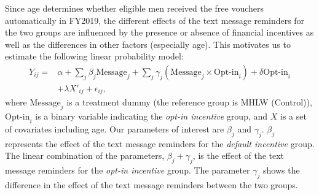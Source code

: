 \documentclass[
      12pt,
    a4paper
]{article}
\begin{document}
Since age determines whether eligible men received the free vouchers automatically in FY2019, the different effects of the text message reminders for the two groups are influenced by the presence or absence of financial incentives as well as the differences in other factors (especially age). This motivates us to estimate the following linear probability model:
\begin{equation}
\begin{split}
Y_{ij} = &\alpha + \sum_j \beta_j \text{Message}_j + \sum_j \gamma_j (\text{Message}_j \times \text{Opt-in}_i) + \delta \text{Opt-in}_i \\
&+ \lambda X'_{ij} + \epsilon_{ij},
\end{split} \label{eq:regression}
\end{equation}
where \(\text{Message}_j\) is a treatment dummy (the reference group is MHLW (Control)), \(\text{Opt-in}_i\) is a binary variable indicating the \emph{opt-in incentive} group, and \(X\) is a set of covariates including age. Our parameters of interest are \(\beta_j\) and \(\gamma_j\). \(\beta_j\) represents the effect of the text message reminders for the \emph{default incentive} group. The linear combination of the parameters, \(\beta_j + \gamma_j\), is the effect of the text message reminders for the \emph{opt-in incentive} group. The parameter \(\gamma_j\) shows the difference in the effect of the text message reminders between the two groups.
\end{document}
